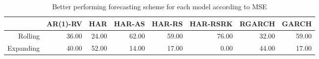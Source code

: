 \begin{table}[ht]
\centering
\begin{tabular}{rrrrrrrr}
  \hline
 & AR(1)-RV & HAR & HAR-AS & HAR-RS & HAR-RSRK & RGARCH & GARCH \\ 
  \hline
Rolling & 36.00 & 24.00 & 62.00 & 59.00 & 76.00 & 32.00 & 59.00 \\ 
  Expanding & 40.00 & 52.00 & 14.00 & 17.00 & 0.00 & 44.00 & 17.00 \\ 
   \hline
\end{tabular}
\caption[Better scheme MSE summary]{Better performing forecasting scheme for each model according to MSE} 
\label{Table:Better_MSE_summary}
\end{table}
